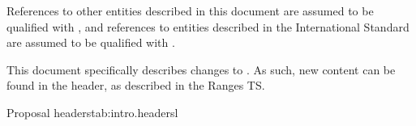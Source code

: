 \pnum
References to other entities described in this document are assumed to be qualified with
, and references to entities described in the International Standard are
assumed to be qualified with .

\pnum
This document specifically describes changes to . As such, new content can be found
in the  header, as described in the Ranges TS.

\begin{floattable}{Proposal headers}{tab:intro.headers}{l}
\topline
{}\\
\bottomline
\end{floattable}
